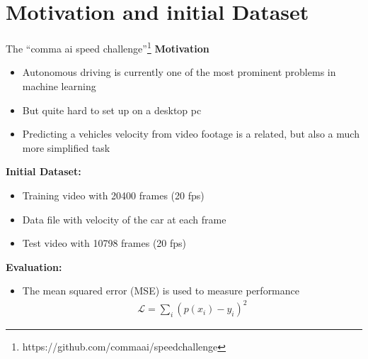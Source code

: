 \section{Motivation and initial Dataset}


\begin{frame}{The \enquote{comma ai speed challenge}\footnote{https://github.com/commaai/speedchallenge}}
	\textbf{Motivation}
	\begin{itemize}
		\item Autonomous driving is currently one of the most prominent problems in machine learning
		\item But quite hard to set up on a desktop pc
		\item Predicting a vehicles velocity from video footage is a related, but also a much more simplified task
	\end{itemize}
	\pause
	\textbf{Initial Dataset:}
	\begin{itemize}
		\item Training video with 20400 frames (20 fps)
		\item Data file with velocity of the car at each frame
		\item Test video with 10798 frames (20 fps)
	\end{itemize}
	\pause
	\textbf{Evaluation:}
	\begin{itemize}
		\item The mean squared error (MSE) is used to measure performance
		\begin{align*}
			\mathcal{L} = \sum_i (p(x_i) - y_i)^2
		\end{align*}
	\end{itemize}
\end{frame}

